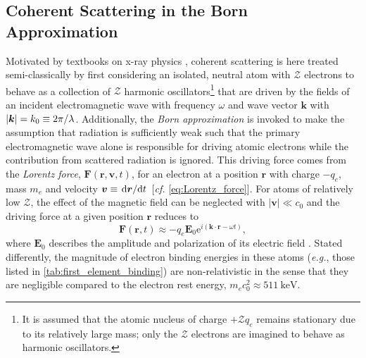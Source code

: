 \subsection{Coherent Scattering in the Born Approximation}\label{sec:scattering_atoms}
Motivated by textbooks on x-ray physics \cite{Attwood17,Als-Nielsen11,deBergevin09}, coherent scattering is here treated semi-classically by first considering an isolated, neutral atom with $\mathcal{Z}$ electrons to behave as a collection of $\mathcal{Z}$ harmonic oscillators\footnote{It is assumed that the atomic nucleus of charge $+ \mathcal{Z} q_e$ remains stationary due to its relatively large mass; only the $\mathcal{Z}$ electrons are imagined to behave as harmonic oscillators.} that are driven by the fields of an incident electromagnetic wave with frequency $\omega$ and wave vector $\mathbold{k}$ with $\abs{\mathbold{k}} = k_0 \equiv 2 \pi / \lambda$. 
Additionally, the \emph{Born approximation} is invoked to make the assumption that radiation is sufficiently weak such that the primary electromagnetic wave alone is responsible for driving atomic electrons while the contribution from scattered radiation is ignored. %
This driving force comes from the \emph{Lorentz force}, $\mathbold{F}(\mathbold{r},\mathbold{v},t)$, for an electron at a position $\mathbold{r}$ with charge $-q_e$, mass $m_e$ and velocity $\mathbold{v} \equiv \dv*{\mathbold{r}}{t}$ [\emph{cf.\@} \cref{eq:Lorentz_force}]. 
For atoms of relatively low $\mathcal{Z}$, the effect of the magnetic field can be neglected with $|\mathbold{v}| \ll c_0$ \cite{Attwood17,Als-Nielsen11} and the driving force at a given position $\mathbold{r}$ reduces to 
\begin{equation}
 \mathbold{F}(\mathbold{r},t) \approx -q_e \mathbold{E}_0 \mathrm{e}^{i \left( \mathbold{k} \cdot \mathbold{r} - \omega t \right)} ,
 \end{equation}
where $\mathbold{E}_0$ describes the amplitude and polarization of its electric field \cite{Attwood17,deBergevin09}. 
Stated differently, the magnitude of electron binding energies in these atoms (\emph{e.g.}, those listed in \cref{tab:first_element_binding}) are non-relativistic in the sense that they are negligible compared to the electron rest energy, $m_e c_0^2 \approx \SI{511}{\kilo\electronvolt}$. 

